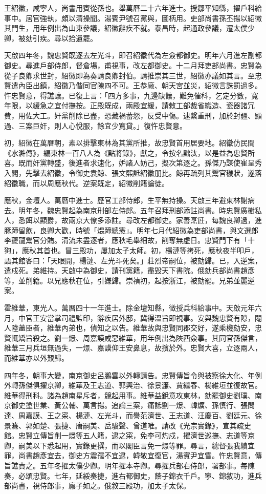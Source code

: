 \begin{pinyinscope}
王紹徽，咸寧人，尚書用賓從孫也。舉萬曆二十六年進士。授鄒平知縣，擢戶科給事中。居官強執，頗以清操聞。湯賓尹號召黨與，圖柄用。吏部尚書孫丕揚以紹徽其門生，用年例出為山東參議，紹徽辭疾不就。泰昌時，起通政參議，遷太僕少卿，被劾引疾。尋以拾遺罷。

天啟四年冬，魏忠賢既逐去左光斗，即召紹徽代為左僉都御史。明年六月進左副都御史。尋進戶部侍郎，督倉場，甫視事，改左都御史。十二月拜吏部尚書。忠賢為從子良卿求世封，紹徽即為奏請良卿封伯。請推崇其三世，紹徽亦議如其言。至忠賢遣內臣出鎮，紹徽乃偕同官陳四不可。王恭廠、朝天宮並災，紹徽言誅罰過多。忤忠賢意，得譙讓。已復上言：「四方多事，九邊缺饟，難免催科，乞定分數，寬年限，以緩急之宜付撫按。正殿既成，兩殿宜緩，請敕工部裁省織造、瓷器諸冗費，用佐大工。奸黨削除已盡，恐藏禍蓄怨，反受中傷。逮繫重刑，加於封疆、顯過、三案巨奸，則人心悅服，餘宜少寬貸。」復忤忠賢意。

初，紹徽在萬曆朝，素以排擊東林為其黨所推，故忠賢首用居要地。紹徽仿民間《水滸傳》，編東林一百八人為《點將錄》，獻之，令按名黜汰，以是益為忠賢所喜。既而奸黨轉盛，後進者求速化，妒諸人妨己，擬次第逐之。孫傑乃謀使崔呈秀入閣，先擊去紹徽，令御史袁鯨、張文熙詆紹徽朋比。鯨再疏列其鬻官穢狀，遂落紹徽職，而以周應秋代。逆案既定，紹徽削籍論徒。

應秋，金壇人。萬曆中進士。歷官工部侍郎，生平無持操。天啟三年避東林謝病去。明年冬，魏忠賢起為南京刑部左侍郎。五年召拜刑部添註尚書。時忠賢廣樹私人，悉餌以顯爵，故兩京大僚多添註。尋改左都御史。家善烹飪，每魏良卿過，進豚蹄留飲，良卿大歡，時號「煨蹄總憲」。明年七月代紹徽為吏部尚書，與文選郎李夔龍鬻官分賄。清流未盡逐者，應秋毛舉細故，削奪無虛日。忠賢門下有「十狗」，應秋其首也。冒三殿功，屢加太子太師。初，楊漣等拷死，應秋夜半叩戶，語其館客曰：「天眼開，楊漣、左光斗死矣。」莊烈帝嗣位，被劾歸。已，入逆案，遣戍死。弟維持。天啟中為御史，請刊黨籍，盡毀天下書院。俄劾兵部尚書趙彥等，並削籍。以兄應秋在位，引嫌歸。崇禎初，起按浙江，被劾罷。兄弟並麗逆案。

霍維華，東光人。萬曆四十一年進士。除金壇知縣，徵授兵科給事中。天啟元年六月，中官王安當掌司禮監印，辭疾居外邸，冀得溫旨即視事。安與魏忠賢有隙，閹人陸藎臣者，維華內弟也，偵知之以告。維華故與忠賢同郡交好，遂乘機劾安，忠賢輒矯旨殺之。劉一燝、周嘉謨咸惡維華，用年例出為陜西僉事。其同官孫傑言，維華三月兵垣無過失，一燝、嘉謨仰王安鼻息，故擯於外。忠賢大喜，立逐兩人，而維華亦以外艱歸。

四年冬，朝事大變，南京御史呂鵬雲以外轉請告。忠賢傳旨令與被察徐大化、年例外轉孫傑俱擢京卿，維華及王志道、郭興治、徐景濂、賈繼春、楊維垣並復故官。維華得刑科。諸為趙南星斥者，競起用事。維華益銳意攻東林，劾罷御史劉璞、南京御史塗世業、黃公輔、萬言揚。追論三案，痛詆劉一燝、韓爌、孫慎行、張問達、周嘉謨、王之寀、楊漣、左光斗，而譽范濟世、王志道、汪慶百、劉廷元、徐景濂、郭如楚、張捷、唐嗣美、岳駿聲、曾道唯。請改《光宗實錄》，宣其疏史館。忠賢立傳旨削一燝等五人籍，逮之寀，免李可灼戍，擢濟世巡撫、志道等京卿，嗣美以下悉起用，實錄更撰，而以閣臣言免一燝等罪。尋言，總督張我續宜罪，尚書趙彥宜去，御史方震孺不宜逮，韓敬宜復官，湯賓尹宜雪。忤忠賢意，傳旨譙責之。五年冬擢太僕少卿。明年擢本寺卿。尋擢兵部右侍郎，署部事。每陳奏，必頌忠賢。七年，延綏奏捷，進右都御史，蔭子錦衣千戶。寧、錦敘功，進兵部尚書，視侍郎事，廕子如之。俄敘三殿功，加太子太保。


\end{pinyinscope}
